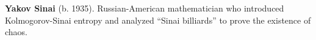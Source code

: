 \textbf{Yakov Sinai} (b. 1935). Russian-American mathematician who introduced Kolmogorov-Sinai entropy and analyzed ``Sinai billiards'' to prove the existence of chaos.

